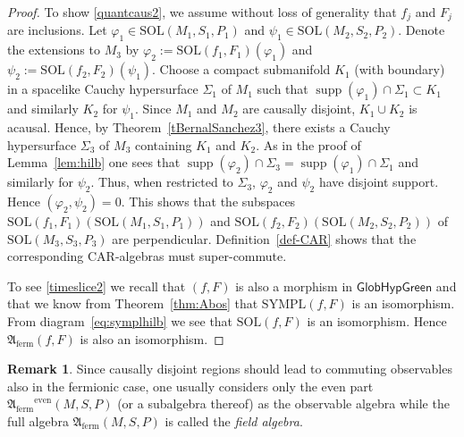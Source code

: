 \documentclass[a4paper,11pt]{amsart}
\theoremstyle{definition}
\newtheorem{rem}[thm]{Remark}
\begin{document}
\begin{proof}
To show \eqref{quantcaus2}, we assume without loss of generality that $f_j$ and $F_j$ are inclusions.
Let ${\varphi}_1\in{\mathrm{SOL}}(M_1,S_1,P_1)$ and $\psi_1\in{\mathrm{SOL}}(M_2,S_2,P_2)$.
Denote the extensions to $M_3$ by ${\varphi}_2:={\mathrm{SOL}}(f_1,F_1)({\varphi}_1)$ and $\psi_2:={\mathrm{SOL}}(f_2,F_2)(\psi_1)$.
Choose a compact submanifold $K_1$ (with boundary) in a spacelike Cauchy hypersurface $\Sigma_1$ of $M_1$ such that ${\operatorname{supp}}({\varphi}_1)\cap\Sigma_1 \subset K_1$ and similarly $K_2$ for $\psi_1$.
Since $M_1$ and $M_2$ are causally disjoint, $K_1 \cup K_2$ is acausal.
Hence, by Theorem~\ref{tBernalSanchez3}, there exists a Cauchy hypersurface $\Sigma_3$ of $M_3$ containing $K_1$ and $K_2$.
As in the proof of Lemma~\ref{lem:hilb} one sees that ${\operatorname{supp}}({\varphi}_2)\cap\Sigma_3={\operatorname{supp}}({\varphi}_1)\cap\Sigma_1$ and similarly for $\psi_2$.
Thus, when restricted to $\Sigma_3$, ${\varphi}_2$ and $\psi_2$ have disjoint support.
Hence $({\varphi}_2,\psi_2)=0$.
This shows that the subspaces ${\mathrm{SOL}}(f_1,F_1)({\mathrm{SOL}}(M_1,S_1,P_1))$ and ${\mathrm{SOL}}(f_2,F_2)({\mathrm{SOL}}(M_2,S_2,P_2))$ of ${\mathrm{SOL}}(M_3,S_3,P_3)$ are perpendicular.
Definition~\ref{def-CAR} shows that the corresponding CAR-algebras must super-commute.

To see \eqref{timeslice2} we recall that $(f,F)$ is also a morphism in ${\mathsf{GlobHypGreen}}$ and that we know from Theorem~\ref{thm:Abos} that ${\mathrm{SYMPL}}(f,F)$ is an isomorphism.
From diagram~\eqref{eq:symplhilb} we see that ${\mathrm{SOL}}(f,F)$ is an isomorphism.
Hence ${\mathfrak{A}_\mathrm{ferm}}(f,F)$ is also an isomorphism.
\end{proof}

\begin{rem}
Since causally disjoint regions should lead to commuting observables also in the fermionic case, one usually considers only the even part ${\mathfrak{A}_\mathrm{ferm}}^\mathrm{even}(M,S,P)$ (or a subalgebra thereof) as the observable algebra while the full algebra ${\mathfrak{A}_\mathrm{ferm}}(M,S,P)$ is called the {\em field algebra}.
\end{rem}
\end{document}
